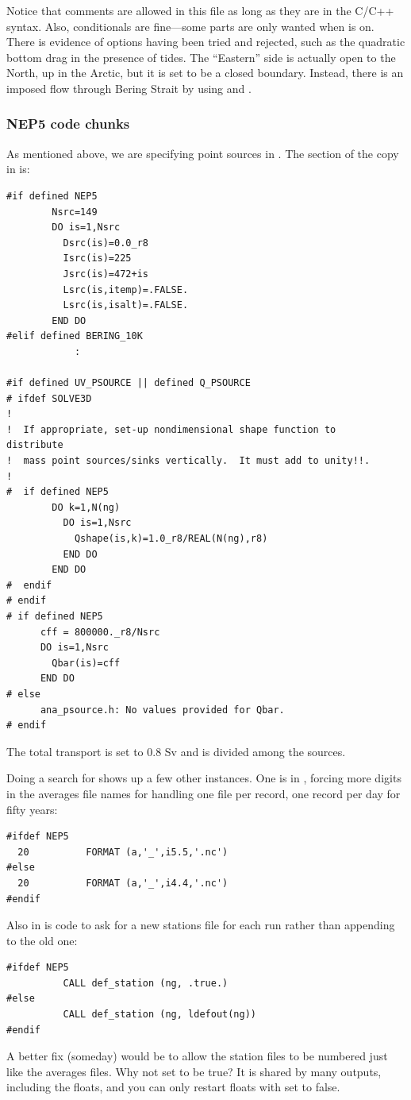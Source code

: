 Notice that comments are allowed in this file as long as they are in
the C/C++ syntax. Also, conditionals are fine---some parts are only
wanted when  is on. There is evidence of options
having been tried and rejected, such as the quadratic bottom drag
in the presence of tides. The ``Eastern'' side is actually open to
the North, up in the Arctic, but it is set to be a closed boundary.
Instead, there is an imposed flow through Bering Strait by using
 and .

\subsubsection{NEP5 code chunks}
As mentioned above, we are specifying point sources in
. The  section of the copy in
 is:
\begin{verbatim}
#if defined NEP5
        Nsrc=149
        DO is=1,Nsrc
          Dsrc(is)=0.0_r8
          Isrc(is)=225
          Jsrc(is)=472+is
          Lsrc(is,itemp)=.FALSE.
          Lsrc(is,isalt)=.FALSE.
        END DO
#elif defined BERING_10K
            :

#if defined UV_PSOURCE || defined Q_PSOURCE
# ifdef SOLVE3D
!
!  If appropriate, set-up nondimensional shape function to
distribute
!  mass point sources/sinks vertically.  It must add to unity!!.
!
#  if defined NEP5
        DO k=1,N(ng)
          DO is=1,Nsrc
            Qshape(is,k)=1.0_r8/REAL(N(ng),r8)
          END DO
        END DO
#  endif
# endif
# if defined NEP5
      cff = 800000._r8/Nsrc
      DO is=1,Nsrc
        Qbar(is)=cff
      END DO
# else
      ana_psource.h: No values provided for Qbar.
# endif
\end{verbatim}
The total transport is set to 0.8 Sv and is divided among the
 sources.

Doing a search for  shows up a few other instances. One
is in , forcing more digits in the averages file names
for handling one file per record, one record per day for fifty
years:
\begin{verbatim}
#ifdef NEP5
  20          FORMAT (a,'_',i5.5,'.nc')
#else
  20          FORMAT (a,'_',i4.4,'.nc')
#endif
\end{verbatim}
Also in  is code to ask for a new stations file for
each run rather than appending to the old one:
\begin{verbatim}
#ifdef NEP5
          CALL def_station (ng, .true.)
#else
          CALL def_station (ng, ldefout(ng))
#endif
\end{verbatim}
A better fix (someday) would be to allow the station files to be
numbered just like the averages files. Why not set  to
be true? It is shared by many outputs, including the floats, and you
can only restart floats with  set to false.

